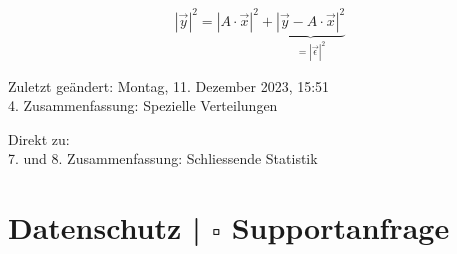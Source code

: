\documentclass[10pt]{article}
\begin{document}
$$
|\vec{y}|^{2}=|A \cdot \vec{x}|^{2}+\underbrace{|\vec{y}-A \cdot \vec{x}|^{2}}_{=|\vec{\epsilon}|^{2}}
$$

Zuletzt geändert: Montag, 11. Dezember 2023, 15:51\\
4. Zusammenfassung: Spezielle Verteilungen

Direkt zu:\\
7. und 8. Zusammenfassung: Schliessende Statistik

\section*{Datenschutz | $\square$ Supportanfrage}
\end{document}
